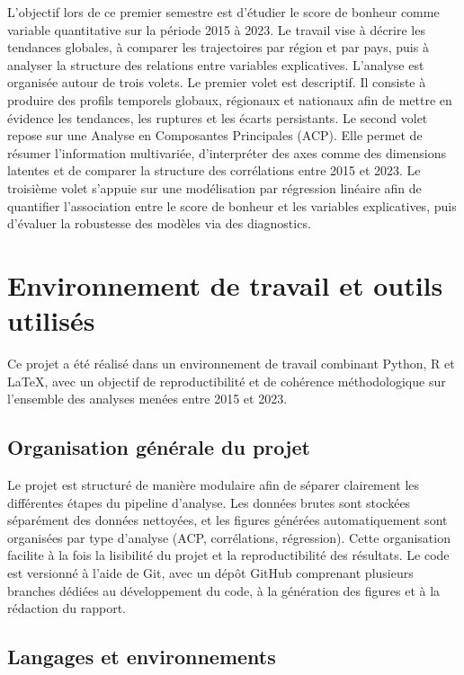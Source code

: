 \documentclass{article}
\begin{document}
L’objectif lors de ce premier semestre est d’étudier le score de bonheur comme variable quantitative sur la période 2015 à 2023. Le travail vise à décrire les tendances globales, à comparer les trajectoires par région et par pays, puis à analyser la structure des relations entre variables explicatives. L’analyse est organisée autour de trois volets.
Le premier volet est descriptif. Il consiste à produire des profils temporels globaux, régionaux et nationaux afin de mettre en évidence les tendances, les ruptures et les écarts persistants.
Le second volet repose sur une Analyse en Composantes Principales (ACP). Elle permet de résumer l’information multivariée, d’interpréter des axes comme des dimensions latentes et de comparer la structure des corrélations entre 2015 et 2023.
Le troisième volet s’appuie sur une modélisation par régression linéaire afin de quantifier l’association entre le score de bonheur et les variables explicatives, puis d’évaluer la robustesse des modèles via des diagnostics.

\newpage
\section{Environnement de travail et outils utilisés}

Ce projet a été réalisé dans un environnement de travail combinant Python, R et \LaTeX{}, avec un objectif de reproductibilité et de cohérence méthodologique sur l’ensemble des analyses menées entre 2015 et 2023.

\subsection{Organisation générale du projet}

Le projet est structuré de manière modulaire afin de séparer clairement les différentes étapes du pipeline d’analyse.
Les données brutes sont stockées séparément des données nettoyées, et les figures générées automatiquement sont organisées par type d’analyse (ACP, corrélations, régression).
Cette organisation facilite à la fois la lisibilité du projet et la reproductibilité des résultats.
Le code est versionné à l’aide de Git, avec un dépôt GitHub comprenant plusieurs branches dédiées au développement du code, à la génération des figures et à la rédaction du rapport.

\subsection{Langages et environnements}
\end{document}
